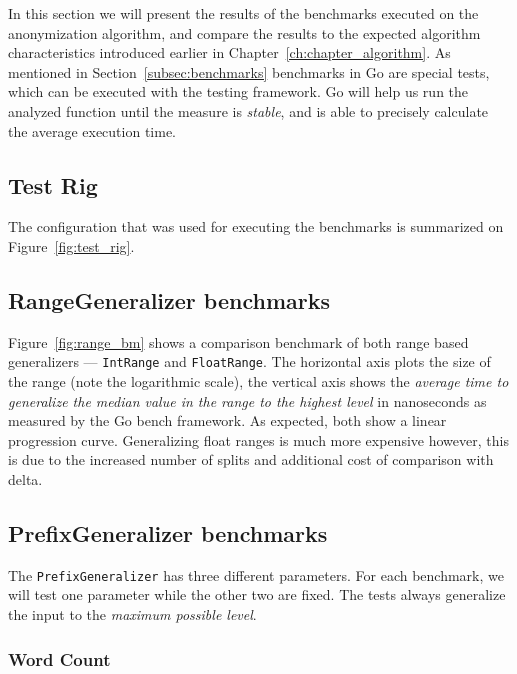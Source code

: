 In this section we will present the results of the benchmarks executed on the anonymization algorithm, and compare the results to the expected algorithm characteristics introduced earlier in Chapter~\ref{ch:chapter_algorithm}. As mentioned in Section~\ref{subsec:benchmarks} benchmarks in Go are special tests, which can be executed with the testing framework. Go will help us run the analyzed function until the measure is \emph{stable}, and is able to precisely calculate the average execution time.

\subsection{Test Rig}

The configuration that was used for executing the benchmarks is summarized on Figure~\ref{fig:test_rig}.


\subsection{RangeGeneralizer benchmarks}

Figure~\ref{fig:range_bm} shows a comparison benchmark of both range based generalizers --- \texttt{IntRange} and \texttt{FloatRange}. The horizontal axis plots the size of the range (note the logarithmic scale), the vertical axis shows the \emph{average time to generalize the median value in the range to the highest level} in nanoseconds as measured by the Go bench framework. As expected, both show a linear progression curve. Generalizing float ranges is much more expensive however, this is due to the increased number of splits and additional cost of comparison with delta.

\vspace{\baselineskip}


\subsection{PrefixGeneralizer benchmarks}

The \texttt{PrefixGeneralizer} has three different parameters. For each benchmark, we will test one parameter while the other two are fixed. The tests always generalize the input to the \emph{maximum possible level}.

\subsubsection{Word Count}

